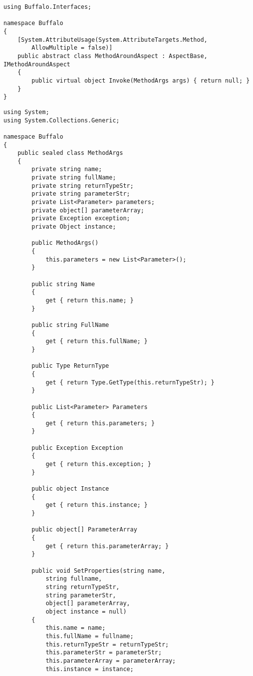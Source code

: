 \begin{lstlisting}[caption={../buffalo/MethodAroundAspect.cs}, label=../buffalo/MethodAroundAspect.cs, frame=tb, basicstyle=\scriptsize]﻿using Buffalo.Interfaces;

namespace Buffalo
{
    [System.AttributeUsage(System.AttributeTargets.Method,
        AllowMultiple = false)]
    public abstract class MethodAroundAspect : AspectBase, IMethodAroundAspect
    {
        public virtual object Invoke(MethodArgs args) { return null; }
    }
}
\end{lstlisting}

\begin{lstlisting}[caption={../buffalo/MethodArgs.cs}, label=../buffalo/MethodArgs.cs, frame=tb, basicstyle=\scriptsize]﻿using System;
using System.Collections.Generic;

namespace Buffalo
{
    public sealed class MethodArgs
    {
        private string name;
        private string fullName;
        private string returnTypeStr;
        private string parameterStr;
        private List<Parameter> parameters;
        private object[] parameterArray;
        private Exception exception;
        private Object instance;

        public MethodArgs()
        {
            this.parameters = new List<Parameter>();
        }

        public string Name
        {
            get { return this.name; }
        }

        public string FullName
        {
            get { return this.fullName; }
        }

        public Type ReturnType
        {
            get { return Type.GetType(this.returnTypeStr); }
        }

        public List<Parameter> Parameters
        {
            get { return this.parameters; }
        }

        public Exception Exception
        {
            get { return this.exception; }
        }

        public object Instance
        {
            get { return this.instance; }
        }

        public object[] ParameterArray
        {
            get { return this.parameterArray; }
        }

        public void SetProperties(string name,
            string fullname,
            string returnTypeStr,
            string parameterStr,
            object[] parameterArray,
            object instance = null)
        {
            this.name = name;
            this.fullName = fullname;
            this.returnTypeStr = returnTypeStr;
            this.parameterStr = parameterStr;
            this.parameterArray = parameterArray;
            this.instance = instance;


\end{lstlisting}
